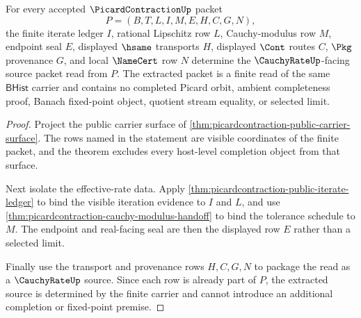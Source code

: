 \begin{theorem}
\label{thm:picardcontraction-cauchyrate-source-extraction}
For every accepted $\PicardContractionUp$ packet
$$
P=(B,T,L,I,M,E,H,C,G,N),
$$
the finite iterate ledger $I$, rational Lipschitz row $L$, Cauchy-modulus row $M$, endpoint seal $E$, displayed $\hsame$ transports $H$, displayed $\Cont$ routes $C$, $\Pkg$ provenance $G$, and local $\NameCert$ row $N$ determine the $\CauchyRateUp$-facing source packet read from $P$. The extracted packet is a finite read of the same $\mathsf{BHist}$ carrier and contains no completed Picard orbit, ambient completeness proof, Banach fixed-point object, quotient stream equality, or selected limit.
\end{theorem}
\begin{proof}
Project the public carrier surface of \autoref{thm:picardcontraction-public-carrier-surface}. The rows named in the statement are visible coordinates of the finite packet, and the theorem excludes every host-level completion object from that surface.

Next isolate the effective-rate data. Apply \autoref{thm:picardcontraction-public-iterate-ledger} to bind the visible iteration evidence to $I$ and $L$, and use \autoref{thm:picardcontraction-cauchy-modulus-handoff} to bind the tolerance schedule to $M$. The endpoint and real-facing seal are then the displayed row $E$ rather than a selected limit.

Finally use the transport and provenance rows $H,C,G,N$ to package the read as a $\CauchyRateUp$ source. Since each row is already part of $P$, the extracted source is determined by the finite carrier and cannot introduce an additional completion or fixed-point premise.
\end{proof}


